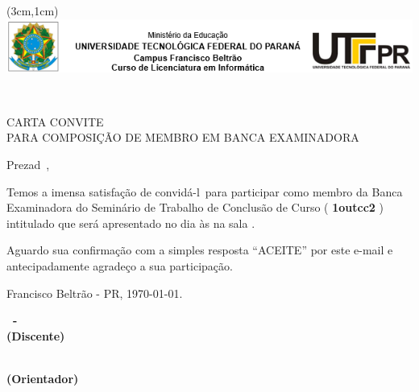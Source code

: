 \documentclass[12pt]{article}
\def \datadeentregadotrabalhoparadisciplina{25 de novembro de 2017}
\begin{document}
\pagestyle{myheadings}
\newpage {}
\thispagestyle{empty}

\begin{center}
    \begin{textblock*}{\linewidth}(3cm,1cm)%
    \centering
     \includegraphics[width=\linewidth]{debib/logo.png}
    \end{textblock*} ~\\[1em]
\end{center}

\vspace{\fill}
\begin{center}
\begin{large}
CARTA CONVITE\\[1em] PARA COMPOSIÇÃO DE MEMBRO EM BANCA EXAMINADORA
\end{large}
\end{center}

\vspace{\fill}
Prezad\profgenero\ \textbf{\profconvidado},

\vspace{\fill}
Temos a imensa satisfação de convidá-l\profgenero\ para participar como membro da Banca Examinadora do Seminário de Trabalho de Conclusão de Curso (
\textbf{\tcc1outcc2}
) intitulado 
\textbf{\MakeUppercase{\titulotrabalho}}
que será apresentado no dia 
\textbf{} às 
\textbf{} na sala 
\textbf{}.

%

Aguardo sua confirmação com a simples resposta ``ACEITE'' por este e-mail e antecipadamente agradeço a sua participação. 

\vspace{\fill}
\hspace{\fill} Francisco Beltrão - PR, \today.
\vspace{\fill}

\begin{center}
\linespread{1} \small 
\textbf{\discente~-~\RAouMatricula\\(Discente)}

\vspace{2em}
\textbf{\proforientador\\(Orientador)}
\end{center}
\end{document}
